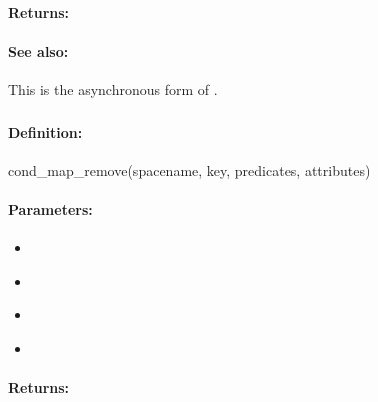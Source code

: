 \paragraph{Returns:}


\paragraph{See also:}  This is the asynchronous form of .

\pagebreak
\subsubsection{}
\label{api:ruby:cond_map_remove}


\paragraph{Definition:}
\begin{rubycode}
cond_map_remove(spacename, key, predicates, attributes)
\end{rubycode}

\paragraph{Parameters:}
\begin{itemize}[noitemsep]
\item {}\\

\item {}\\

\item {}\\

\item {}\\

\end{itemize}

\paragraph{Returns:}


